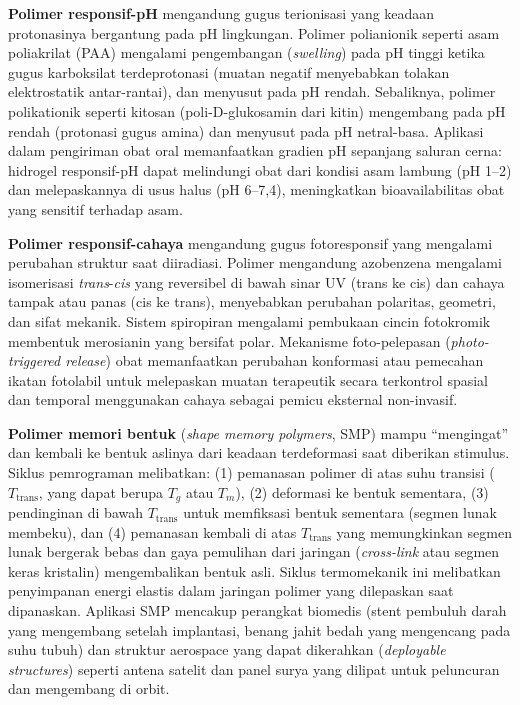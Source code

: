 \documentclass[12pt,a4paper,openany]{book}
\begin{document}
\textbf{Polimer responsif-pH} mengandung gugus terionisasi yang keadaan protonasinya bergantung pada pH lingkungan. Polimer polianionik seperti asam poliakrilat (PAA) mengalami pengembangan (\textit{swelling}) pada pH tinggi ketika gugus karboksilat terdeprotonasi (muatan negatif menyebabkan tolakan elektrostatik antar-rantai), dan menyusut pada pH rendah. Sebaliknya, polimer polikationik seperti kitosan (poli-D-glukosamin dari kitin) mengembang pada pH rendah (protonasi gugus amina) dan menyusut pada pH netral-basa. Aplikasi dalam pengiriman obat oral memanfaatkan gradien pH sepanjang saluran cerna: hidrogel responsif-pH dapat melindungi obat dari kondisi asam lambung (pH 1--2) dan melepaskannya di usus halus (pH 6--7,4), meningkatkan bioavailabilitas obat yang sensitif terhadap asam.

\textbf{Polimer responsif-cahaya} mengandung gugus fotoresponsif yang mengalami perubahan struktur saat diiradiasi. Polimer mengandung azobenzena mengalami isomerisasi \textit{trans}-\textit{cis} yang reversibel di bawah sinar UV (trans ke cis) dan cahaya tampak atau panas (cis ke trans), menyebabkan perubahan polaritas, geometri, dan sifat mekanik. Sistem spiropiran mengalami pembukaan cincin fotokromik membentuk merosianin yang bersifat polar. Mekanisme foto-pelepasan (\textit{photo-triggered release}) obat memanfaatkan perubahan konformasi atau pemecahan ikatan fotolabil untuk melepaskan muatan terapeutik secara terkontrol spasial dan temporal menggunakan cahaya sebagai pemicu eksternal non-invasif.

\textbf{Polimer memori bentuk} (\textit{shape memory polymers}, SMP) mampu ``mengingat'' dan kembali ke bentuk aslinya dari keadaan terdeformasi saat diberikan stimulus. Siklus pemrograman melibatkan: (1) pemanasan polimer di atas suhu transisi ($T_{\text{trans}}$, yang dapat berupa $T_g$ atau $T_m$), (2) deformasi ke bentuk sementara, (3) pendinginan di bawah $T_{\text{trans}}$ untuk memfiksasi bentuk sementara (segmen lunak membeku), dan (4) pemanasan kembali di atas $T_{\text{trans}}$ yang memungkinkan segmen lunak bergerak bebas dan gaya pemulihan dari jaringan (\textit{cross-link} atau segmen keras kristalin) mengembalikan bentuk asli. Siklus termomekanik ini melibatkan penyimpanan energi elastis dalam jaringan polimer yang dilepaskan saat dipanaskan. Aplikasi SMP mencakup perangkat biomedis (stent pembuluh darah yang mengembang setelah implantasi, benang jahit bedah yang mengencang pada suhu tubuh) dan struktur aerospace yang dapat dikerahkan (\textit{deployable structures}) seperti antena satelit dan panel surya yang dilipat untuk peluncuran dan mengembang di orbit.
\end{document}

